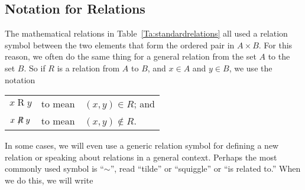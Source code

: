 \subsection*{Notation for Relations}
The mathematical relations in Table~\ref{Ta:standardrelations} all used a relation symbol between the two elements that form the ordered pair in  $A \times B$.  For this reason, we often do the same thing for  a general relation from the set  $A$  to the set  $B$.  So if  $R$  is a relation from  $A$  to  $B$, and  $x \in A$ and  $y \in B$, we use the notation  

\label{sym:xrelatedy}
\begin{center}
\begin{tabular}{c l l}
$x \mathrel{R} y$  &  to mean  &  $\left( {x, y} \right) \in R$; and \\
$x \mathrel{\not \negthickspace R} y$  &  to mean  &  
$\left( {x, y} \right) \notin R$. \\
\end{tabular}
\end{center}
In some cases, we will even use a generic relation symbol for defining a new relation or speaking about relations in a general context.  Perhaps the most commonly used symbol is  
``$\sim $'',  read ``tilde'' or ``squiggle'' or ``is related to.''  When we do this, we will write

